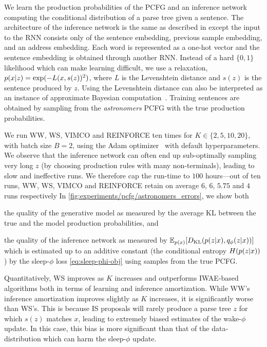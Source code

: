 We learn the production probabilities of the \gls{PCFG} and an inference network computing the conditional distribution of a parse tree given a sentence.
The architecture of the inference network is the same as described in \citep[Section 3.3]{le2017inference} except the input to the \gls{RNN} consists only of the sentence embedding, previous sample embedding, and an address embedding.
Each word is represented as a one-hot vector and the sentence embedding is obtained through another \gls{RNN}.
Instead of a hard $\{0, 1\}$ likelihood which can make learning difficult, we use a relaxation, $p(x \lvert z) = \exp(-L(x, s(z))^2)$, where $L$ is the Levenshtein distance and $s(z)$ is the sentence produced by $z$.
Using the Levenshtein distance can also be interpreted as an instance of approximate Bayesian computation~\citep{Sisson2018handbook}.
Training sentences are obtained by sampling from the \emph{astronomers} \gls{PCFG} with the true production probabilities.

We run \gls{WW}, \gls{WS}, \gls{VIMCO} and \acrshort{REINFORCE} ten times for $K \in \{2, 5, 10, 20\}$, with batch size \(B=2\), using the Adam optimizer~\citep{Kingma2015adam} with default hyperparameters.
We observe that the inference network can often end up sub-optimally sampling very long $z$ (by choosing production rules with many non-terminals), leading to slow and ineffective runs.
We therefore cap the run-time to $100$ hours---out of ten runs, \gls{WW}, \gls{WS}, \gls{VIMCO} and \acrshort{REINFORCE} retain on average $6$, $6$, $5.75$ and $4$ runs respectively
In \cref{fig:experiments/pcfg/astronomers_errors}, we show both
\begin{inparaenum}[(i)]
\item the quality of the generative model as measured by the average \gls{KL} between the true and the model production probabilities, and
\item the quality of the inference network as measured by $\mathbb{E}_{p(x)}[D_{\mathrm{KL}}(p(z \lvert x), q_\phi(z \lvert x))]$ which is estimated up to an additive constant (the conditional entropy $H(p(z \lvert x))$) by the sleep-$\phi$ loss \cref{eq:sleep-phi-obj} using samples from the true \gls{PCFG}.
\end{inparaenum}

Quantitatively, \gls{WS} improves as $K$ increases and outperforms \gls{IWAE}-based algorithms both in terms of learning and inference amortization.
While \gls{WW}'s inference amortization improves slightly as $K$ increases, it is significantly worse than \gls{WS}'s.
This is because \gls{IS} proposals will rarely produce a parse tree $z$ for which $s(z)$ matches $x$, leading to extremely biased estimates of the wake-$\phi$ update.
In this case, this bias is more significant than that of the data-distribution which can harm the sleep-$\phi$ update.

